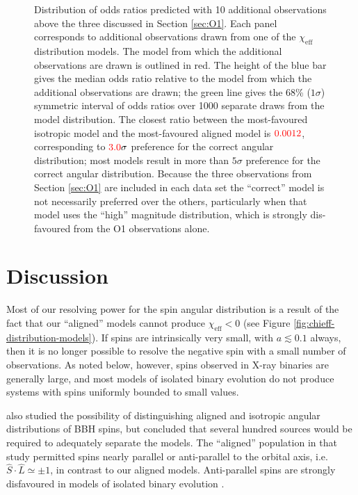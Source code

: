 \documentclass[modern,linenumbers]{aastex61}
\newcommand{\chieff}{\chi_\mathrm{eff}}
\newcommand{\checkme}[1]{\textcolor{red}{#1}}
\newcommand{\OTwoSigmaIsoAlignedMin}{\checkme{3.0}}
\newcommand{\OTwoOddsIsoAlignedMin}{\checkme{0.0012}}
\begin{document}
\begin{figure}
  \caption{\label{fig:O2-predictions} Distribution of odds ratios
    predicted with 10 additional observations above the three
    discussed in Section \ref{sec:O1}.  Each panel corresponds to
    additional observations drawn from one of the $\chieff$
    distribution models.  The model from which the additional
    observations are drawn is outlined in red.  The height of the blue
    bar gives the median odds ratio relative to the model from which
    the additional observations are drawn; the green line gives the
    68\% ($1 \sigma$) symmetric interval of odds ratios over 1000
    separate draws from the model distribution.  The closest ratio
    between the most-favoured isotropic model and the most-favoured
    aligned model is $\OTwoOddsIsoAlignedMin$, corresponding to
    $\OTwoSigmaIsoAlignedMin\sigma$ preference for the correct angular
    distribution; most models result in more than $5\sigma$ preference
    for the correct angular distribution.  Because the three
    observations from Section \ref{sec:O1} are included in each data
    set the ``correct'' model is not necessarily preferred over the
    others, particularly when that model uses the ``high'' magnitude
    distribution, which is strongly dis-favoured from the O1
    observations alone.}
\end{figure}

\section{Discussion}

Most of our resolving power for the spin angular distribution is a
result of the fact that our ``aligned'' models cannot produce
$\chieff < 0$ (see Figure \ref{fig:chieff-distribution-models}).  If
spins are intrinsically very small, with $a \lesssim 0.1$ always, then
it is no longer possible to resolve the negative spin with a small
number of observations.  As noted below, however, spins observed in
X-ray binaries are generally large, and most models of isolated binary
evolution do not produce systems with spins uniformly bounded to small
values.

\citet{2017CQGra..34cLT01V} also studied the possibility of
distinguishing aligned and isotropic angular distributions of \ac{BBH}
spins, but concluded that several hundred sources would be required to
adequately separate the models.  The ``aligned'' population in that
study permitted spins nearly parallel or anti-parallel to the orbital
axis, i.e.\ $\hat{S}\cdot \hat{L} \simeq \pm 1$, in contrast to our
aligned models.  Anti-parallel spins are strongly disfavoured in
models of isolated binary evolution \citep[e.g.,]{Kalogera:2000}.  
\end{document}
